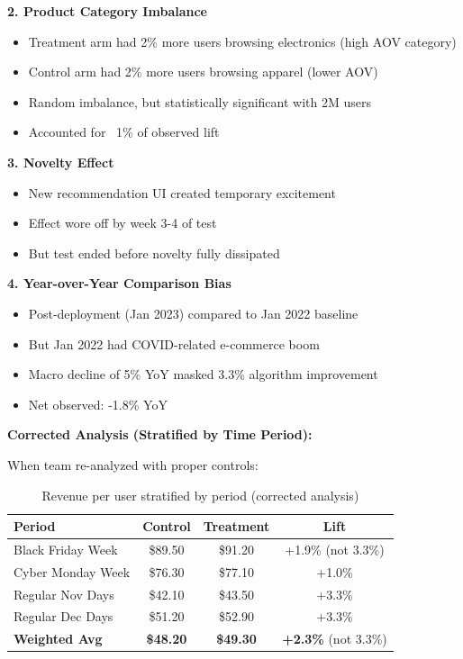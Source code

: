\textbf{2. Product Category Imbalance}
\begin{itemize}
    \item Treatment arm had 2\% more users browsing electronics (high AOV category)
    \item Control arm had 2\% more users browsing apparel (lower AOV)
    \item Random imbalance, but statistically significant with 2M users
    \item Accounted for ~1\% of observed lift
\end{itemize}

\textbf{3. Novelty Effect}
\begin{itemize}
    \item New recommendation UI created temporary excitement
    \item Effect wore off by week 3-4 of test
    \item But test ended before novelty fully dissipated
\end{itemize}

\textbf{4. Year-over-Year Comparison Bias}
\begin{itemize}
    \item Post-deployment (Jan 2023) compared to Jan 2022 baseline
    \item But Jan 2022 had COVID-related e-commerce boom
    \item Macro decline of 5\% YoY masked 3.3\% algorithm improvement
    \item Net observed: -1.8\% YoY
\end{itemize}

\textbf{Corrected Analysis (Stratified by Time Period):}

When team re-analyzed with proper controls:

\begin{table}[h]
\centering
\begin{tabular}{lccc}
\hline
\textbf{Period} & \textbf{Control} & \textbf{Treatment} & \textbf{Lift} \\
\hline
Black Friday Week & \$89.50 & \$91.20 & +1.9\% (not 3.3\%) \\
Cyber Monday Week & \$76.30 & \$77.10 & +1.0\% \\
Regular Nov Days & \$42.10 & \$43.50 & +3.3\% \\
Regular Dec Days & \$51.20 & \$52.90 & +3.3\% \\
\hline
\textbf{Weighted Avg} & \textbf{\$48.20} & \textbf{\$49.30} & \textbf{+2.3\%} (not 3.3\%) \\
\hline
\end{tabular}
\caption{Revenue per user stratified by period (corrected analysis)}
\end{table}

